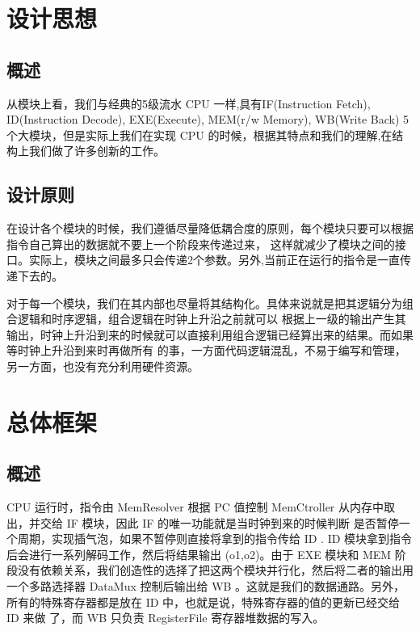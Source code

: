 \documentclass[10pt]{article}
\begin{document}
\begin{CJK}{UTF8}{gbsn}
\section{设计思想}
\subsection{概述}
从模块上看，我们与经典的5级流水 CPU 一样,具有IF(Instruction Fetch), ID(Instruction Decode), EXE(Execute), MEM(r/w Memory),
WB(Write Back) 5个大模块，但是实际上我们在实现 CPU 的时候，根据其特点和我们的理解,在结构上我们做了许多创新的工作。

\subsection{设计原则}
在设计各个模块的时候，我们遵循尽量降低耦合度的原则，每个模块只要可以根据指令自己算出的数据就不要上一个阶段来传递过来，
这样就减少了模块之间的接口。实际上，模块之间最多只会传递2个参数。另外,当前正在运行的指令是一直传递下去的。

对于每一个模块，我们在其内部也尽量将其结构化。具体来说就是把其逻辑分为组合逻辑和时序逻辑，组合逻辑在时钟上升沿之前就可以
根据上一级的输出产生其输出，时钟上升沿到来的时候就可以直接利用组合逻辑已经算出来的结果。而如果等时钟上升沿到来时再做所有
的事，一方面代码逻辑混乱，不易于编写和管理，另一方面，也没有充分利用硬件资源。

\section{总体框架}

\subsection{概述}
CPU 运行时，指令由 MemResolver 根据 PC 值控制 MemCtroller 从内存中取出，并交给 IF 模块，因此 IF 的唯一功能就是当时钟到来的时候判断
是否暂停一个周期，实现插气泡，如果不暂停则直接将拿到的指令传给 ID .  ID 模块拿到指令后会进行一系列解码工作，然后将结果输出
(o1,o2)。由于 EXE 模块和 MEM 阶段没有依赖关系，我们创造性的选择了把这两个模块并行化，然后将二者的输出用一个多路选择器 DataMux
控制后输出给 WB 。这就是我们的数据通路。另外，所有的特殊寄存器都是放在 ID 中，也就是说，特殊寄存器的值的更新已经交给 ID 来做
了，而 WB 只负责 RegisterFile 寄存器堆数据的写入。


\end{CJK}
\end{document}
